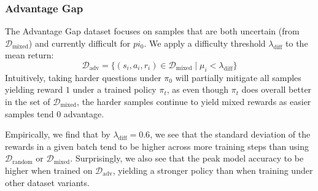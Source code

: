 \subsubsection{Advantage Gap}
The Advantage Gap dataset focuses on samples that are both uncertain (from $\mathcal{D}_{\text{mixed}}$) and currently difficult for $pi_0$. We apply a difficulty threshold $\lambda_{\text{diff}}$ to the mean return:
\begin{equation}
    \mathcal{D}_{\text{adv}} = \{ (s_i, a_i, r_i) \in \mathcal{D}_{\text{mixed}} \mid \mu_i < \lambda_{\text{diff}} \}
\end{equation}
Intuitively, taking harder questions under $\pi_0$ will partially mitigate all samples yielding reward $1$ under a trained policy $\pi_t$, as even though $\pi_t$ does overall better in the set of $\mathcal{D}_{\text{mixed}}$, the harder samples continue to yield mixed rewards as easier samples tend $0$ advantage.

Empirically, we find that by $\lambda_{\text{diff}} = 0.6$, we see that the standard deviation of the rewards in a given batch tend to be higher across more training steps than using $\mathcal{D}_{\text{random}}$ or $\mathcal{D}_{\text{mixed}}$. Surprisingly, we also see that the peak model accuracy to be higher when trained on $\mathcal{D}_{\text{adv}}$, yielding a stronger policy than when training under other dataset variants.